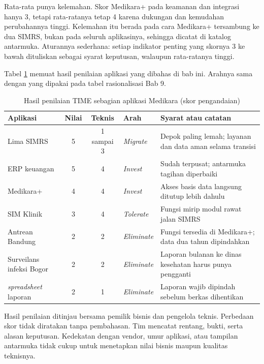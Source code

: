 Rata-rata punya kelemahan. Skor Medikara+ pada keamanan dan integrasi hanya 3, tetapi rata-ratanya
tetap 4 karena dukungan dan kemudahan perubahannya tinggi. Kelemahan itu berada pada cara Medikara+
tersambung ke dua SIMRS, bukan pada seluruh aplikasinya, sehingga dicatat di katalog antarmuka.
Aturannya sederhana: setiap indikator penting yang skornya 3 ke bawah dituliskan sebagai syarat
keputusan, walaupun rata-ratanya tinggi.

Tabel \ref{tab:ch07-skor} memuat hasil penilaian aplikasi yang dibahas di bab ini. Arahnya sama
dengan yang dipakai pada tabel rasionalisasi Bab 9.

\begin{table}[!htb]
  \centering
  \caption{Hasil penilaian TIME sebagian aplikasi Medikara (skor pengandaian)}
  \label{tab:ch07-skor}
  \small
  \begin{tabularx}{\textwidth}{>{\raggedright\arraybackslash}p{3.4cm}cc>{\raggedright\arraybackslash}p{1.6cm}>{\raggedright\arraybackslash}X}
    \hline
    \textbf{Aplikasi} & \textbf{Nilai} & \textbf{Teknis} & \textbf{Arah} & \textbf{Syarat atau catatan} \\
    \hline
    Lima SIMRS & 5 & 1 sampai 3 & \textit{Migrate} & Depok paling lemah; layanan dan data aman selama transisi \\
    \hline
    ERP keuangan & 5 & 4 & \textit{Invest} & Sudah terpusat; antarmuka tagihan diperbaiki \\
    \hline
    Medikara+ & 4 & 4 & \textit{Invest} & Akses basis data langsung ditutup lebih dahulu \\
    \hline
    SIM Klinik & 3 & 4 & \textit{Tolerate} & Fungsi mirip modul rawat jalan SIMRS \\
    \hline
    Antrean Bandung & 2 & 2 & \textit{Eliminate} & Fungsi tersedia di Medikara+; data dua tahun dipindahkan \\
    \hline
    Surveilans infeksi Bogor & 2 & 2 & \textit{Eliminate} & Laporan bulanan ke dinas kesehatan harus punya pengganti \\
    \hline
    23 \textit{spreadsheet} laporan & 2 & 1 & \textit{Eliminate} & Laporan wajib dipindah sebelum berkas dihentikan \\
    \hline
  \end{tabularx}
\end{table}

Hasil penilaian ditinjau bersama pemilik bisnis dan pengelola teknis. Perbedaan skor tidak diratakan
tanpa pembahasan. Tim mencatat rentang, bukti, serta alasan keputusan. Kedekatan dengan vendor, umur
aplikasi, atau tampilan antarmuka tidak cukup untuk menetapkan nilai bisnis maupun kualitas teknisnya.

